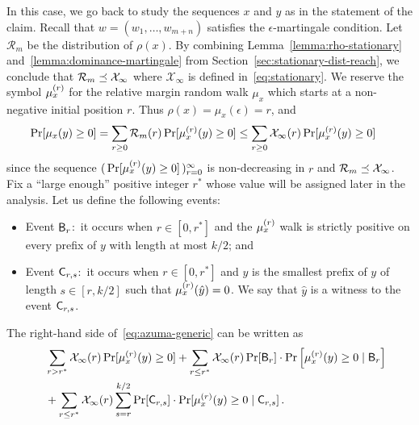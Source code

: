 In this case, we go back to study the sequences $x$ and $y$ as in the statement of the claim.
Recall that $w = (w_1, \ldots, w_{m+n})$ satisfies the $\epsilon$-martingale condition. 
Let $\mathcal{R}_m$ be the distribution of $\rho(x)$.
By combining Lemma~\ref{lemma:rho-stationary} and~\ref{lemma:dominance-martingale} from Section~\ref{sec:stationary-dist-reach}, 
we conclude that $\mathcal{R}_m \preceq \mathcal{X}_\infty$ 
where $\mathcal{X}_\infty$ is defined in~\eqref{eq:stationary}.
We reserve the symbol $\mu_x^{(r)}$ for the relative margin 
random walk $\mu_x$ which starts at a non-negative initial position $r$. 
Thus $\rho(x) = \mu_x(\epsilon) = r$, and
\begin{align}\label{eq:azuma-generic}
\Pr[\mu_x(y) \geq 0] 
&= \sum_{r \geq 0}{\mathcal{R}_m(r) \Pr[\mu_x^{(r)}(y) \geq 0]} 
\leq \sum_{r \geq 0}{\mathcal{X}_\infty(r) \Pr[\mu_x^{(r)}(y) \geq 0]} 
\, 
\end{align}
since the sequence $( \, \Pr[\mu_x^{(r)}(y) \geq 0] \, )_{r=0}^\infty$ is non-decreasing in $r$ 
and $\mathcal{R}_m \preceq \mathcal{X}_\infty$. 
Fix a ``large enough'' positive integer $r^*$ whose value will be assigned later in the analysis. 
Let us define the following events:
 \begin{itemize}
  \item Event $\mathsf{B}_r$:~it occurs when $r \in [0, r^*]$ and the $\mu_x^{(r)}$ walk is strictly positive on every prefix of $y$ with length at most $k/2$; and 
  \item Event $\mathsf{C}_{r,s}$:~it occurs when $r \in [0, r^*]$ and 
  $\hat{y}$ is the smallest prefix of $y$ of length $s \in [r, k/2]$ 
  such that $\mu_x^{(r)}(\hat{y}) = 0$. 
  We say that $\hat{y}$ is a witness to the event $\mathsf{C}_{r, s}$.
\end{itemize}
The right-hand side of~\eqref{eq:azuma-generic} can be written as
\begin{align*}
     &\quad \sum_{r>r^*}{\mathcal{X}_\infty(r) \Pr[\mu_x^{(r)}(y) \geq 0]} 
		+ \sum_{r \leq r^*}{\mathcal{X}_\infty(r) \Pr[\mathsf{B}_r] \cdot \Pr\left[\mu_x^{(r)}(y) \geq 0 \mid \mathsf{B}_r\right]} \\
    &\quad+ \sum_{r \leq r^*}{\mathcal{X}_\infty(r) \sum_{s = r}^{k/2}{\Pr[\mathsf{C}_{r,s}] \cdot \Pr[\mu_x^{(r)}(y) \geq 0 \mid \mathsf{C}_{r,s}]} }
    \, .
\end{align*} 
